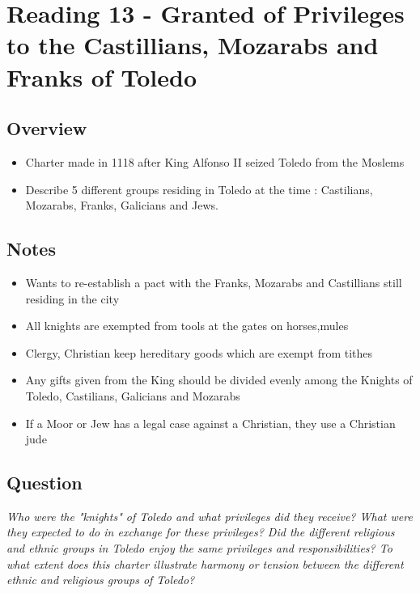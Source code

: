 \documentclass[12pt]{article}
\begin{document}
\section*{Reading 13 - Granted of Privileges to the Castillians, Mozarabs and Franks of Toledo}

\subsection*{Overview}

\begin{itemize}
	\item Charter made in 1118 after King Alfonso II seized Toledo from the Moslems
	\item Describe 5 different groups residing in Toledo at the time : Castilians, Mozarabs, Franks, Galicians and Jews.
\end{itemize}

\subsection*{Notes}

\begin{itemize}
	\item Wants to re-establish a pact with the Franks, Mozarabs and Castillians still residing in the city
	\item All knights are exempted from tools at the gates on horses,mules
	\item Clergy, Christian keep hereditary goods which are exempt from tithes
	\item Any gifts given from the King should be divided evenly among the Knights of Toledo, Castilians, Galicians and Mozarabs
	\item If a Moor or Jew has a legal case against a Christian, they use a Christian jude
\end{itemize}

\subsection*{Question}

\textit{Who were the "knights" of Toledo and what privileges did they receive? What were they expected to do in exchange for these privileges? Did the different religious and ethnic groups in Toledo enjoy the same privileges and responsibilities? To what extent does this charter illustrate harmony or tension between the different ethnic and religious groups of Toledo?}
\end{document}
